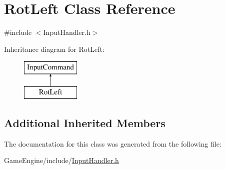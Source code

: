 \hypertarget{class_rot_left}{}\section{Rot\+Left Class Reference}
\label{class_rot_left}


{\ttfamily \#include $<$Input\+Handler.\+h$>$}

Inheritance diagram for Rot\+Left\+:\begin{figure}[H]
\begin{center}
\leavevmode
\includegraphics[height=2.000000cm]{class_rot_left}
\end{center}
\end{figure}
\subsection*{Additional Inherited Members}


The documentation for this class was generated from the following file\+:\begin{DoxyCompactItemize}
\item 
Game\+Engine/include/\mbox{\hyperlink{_input_handler_8h}{Input\+Handler.\+h}}\end{DoxyCompactItemize}
